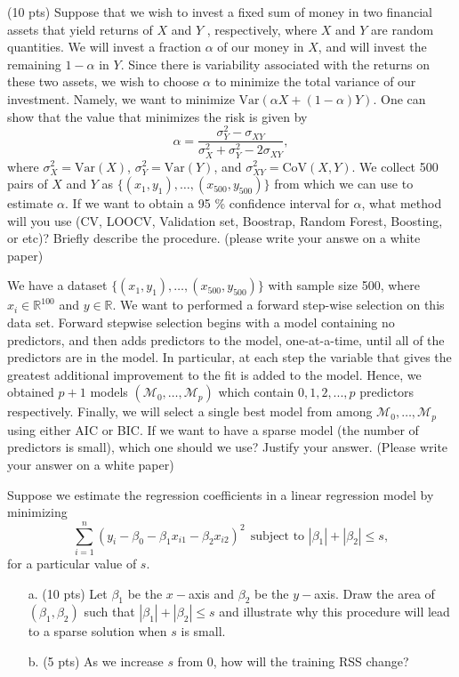 \documentclass[11pt,letter]{exam}
\begin{document}
\begin{questions}

\item (10 pts) Suppose that we wish to invest a fixed sum of money in two financial assets that yield returns of $X$ and $Y$ ,
 respectively, where $X$ and $Y$ are  random quantities. We will invest a fraction $\alpha$ of our money in $X$, and will invest the remaining
  $1 - \alpha$ in $Y$. Since there is variability associated with the returns on these two assets, we wish to choose $\alpha$ to minimize the total
 variance of our investment.  Namely, we want to minimize  $\text{Var}(\alpha X + (1 - \alpha)Y )$.
  One can show that the value that minimizes the risk is given by
  \[
  \alpha = \frac{\sigma^2_Y - \sigma_{XY}}{\sigma^2_{X} + \sigma_Y^2 - 2 \sigma_{XY}},
  \]
where $\sigma^2_X = \text{Var}(X)$, $\sigma^2_Y = \text{Var}(Y)$, and $\sigma^2_{XY} = \text{CoV}(X, Y)$. We collect 500 pairs of $X$ and $Y$ as $\{(x_1, y_1), \ldots, (x_{500}, y_{500}) \}$ from  which we can use to estimate $\alpha$. If we want to obtain a 95 \% confidence interval for $\alpha$, what method will you use (CV, LOOCV, Validation set, Boostrap, Random Forest, Boosting, or etc)? Briefly describe the procedure. (please write your answe on a white paper)

\newpage
\question[10] We have a dataset $\{ (x_1, y_1), \ldots, (x_{500}, y_{500}) \} $ with sample size 500, where $x_i \in \mathbb{R}^{100}$ and $y \in \mathbb{R}$. 
 We want to performed a forward step-wise selection on this data set.  Forward stepwise selection begins with a model containing no predictors, and then adds predictors
to the model, one-at-a-time, until all of the predictors are in the model. In particular, at each step the variable that gives the greatest additional improvement to the fit is added to the model.
Hence, we obtained $p + 1$ models $(\mathcal{M}_0, \ldots, \mathcal{M}_p)$ which contain $0, 1, 2, . . . , p$ predictors respectively. Finally, we will select a single best model from among $\mathcal{M}_0, \ldots, \mathcal{M}_p$ using either AIC or BIC. If we want to have a sparse model (the number of predictors is small), which one should we use?  Justify your answer.  (Please write your answer on a white paper)
\newpage

\item Suppose we estimate the regression coefficients in a linear regression model by minimizing 
\[
	\sum_{i = 1}^n \left( y_i - \beta_0 - \beta_1 x_{i1} - \beta_2 x_{i2} \right)^2 \ \ \text{subject to } |\beta_1| + |\beta_2| \leq s,   
\]
for a particular value of $s$. 
\begin{itemize}
	\item[a.] (10 pts) Let $\beta_1$ be the $x-$axis and $\beta_2$ be the $y-$axis. Draw the area of $(\beta_1, \beta_2)$ such that $|\beta_1| + |\beta_2| \leq s$ and illustrate why this procedure will lead to a sparse solution when $s$ is small. 
	\item[b.] (5 pts) As we increase $s$ from 0, how will the training RSS change?  
\end{itemize}


\end{questions}
\end{document}
